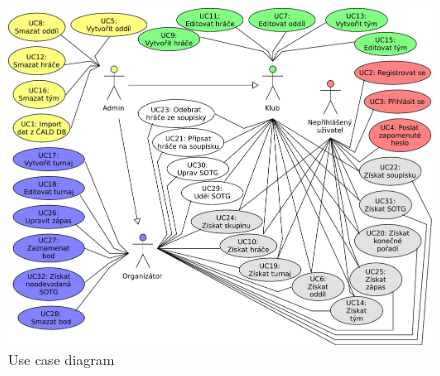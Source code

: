     
\begin{figure}[ht!]
\centering
\includegraphics[width=130mm]{./images/use-case.pdf}
\caption{Use case diagram\label{overflow}}
\end{figure}
